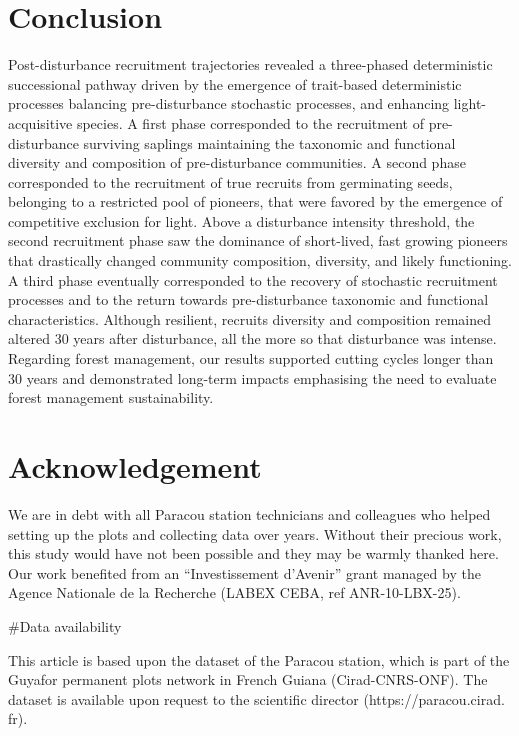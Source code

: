 \documentclass[fleqn,10pt]{ArtEcoFoG} %
\begin{document}
\hypertarget{conclusion}{%
\section{Conclusion}\label{conclusion}}

Post-disturbance recruitment trajectories revealed a three-phased deterministic successional pathway driven by the emergence of trait-based deterministic processes balancing pre-disturbance stochastic processes, and enhancing light-acquisitive species.
A first phase corresponded to the recruitment of pre-disturbance surviving saplings maintaining the taxonomic and functional diversity and composition of pre-disturbance communities.
A second phase corresponded to the recruitment of true recruits from germinating seeds, belonging to a restricted pool of pioneers, that were favored by the emergence of competitive exclusion for light.
Above a disturbance intensity threshold, the second recruitment phase saw the dominance of short-lived, fast growing pioneers that drastically changed community composition, diversity, and likely functioning.
A third phase eventually corresponded to the recovery of stochastic recruitment processes and to the return towards pre-disturbance taxonomic and functional characteristics.
Although resilient, recruits diversity and composition remained altered 30 years after disturbance, all the more so that disturbance was intense.
Regarding forest management, our results supported cutting cycles longer than 30 years and demonstrated long-term impacts emphasising the need to evaluate forest management sustainability.
\color{black}

\hypertarget{acknowledgement}{%
\section{Acknowledgement}\label{acknowledgement}}

We are in debt with all Paracou station technicians and colleagues who helped setting up the plots and collecting data over years.
Without their precious work, this study would have not been possible and they may be warmly thanked here.
Our work benefited from an ``Investissement d'Avenir'' grant managed by the Agence
Nationale de la Recherche (LABEX CEBA, ref ANR-10-LBX-25).

\#Data availability

This article is based upon the dataset of the Paracou station, which is part of the Guyafor permanent plots network in French Guiana (Cirad-CNRS-ONF). The dataset is available upon request to the scientific director (https://paracou.cirad. fr).
\end{document}
